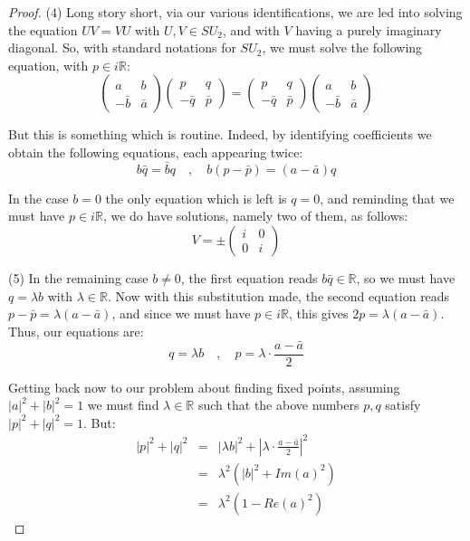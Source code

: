 \documentclass[12pt]{amsbook}
\begin{document}
\begin{proof}
\medskip

(4) Long story short, via our various identifications, we are led into solving the equation $UV=VU$ with $U,V\in SU_2$, and with $V$ having a purely imaginary diagonal. So, with standard notations for $SU_2$, we must solve the following equation, with $p\in i\mathbb R$:
$$\begin{pmatrix}a&b\\-\bar{b}&\bar{a}\end{pmatrix}
\begin{pmatrix}p&q\\-\bar{q}&\bar{p}\end{pmatrix}
=\begin{pmatrix}p&q\\-\bar{q}&\bar{p}\end{pmatrix}
\begin{pmatrix}a&b\\-\bar{b}&\bar{a}\end{pmatrix}$$

But this is something which is routine. Indeed, by identifying coefficients we obtain the following equations, each appearing twice:
$$b\bar{q}=\bar{b}q\quad,\quad b(p-\bar{p})=(a-\bar{a})q$$

In the case $b=0$ the only equation which is left is $q=0$, and reminding that we must have $p\in i\mathbb R$, we do have solutions, namely two of them, as follows:
$$V=\pm\begin{pmatrix}i&0\\0&i\end{pmatrix}$$

(5) In the remaining case $b\neq0$, the first equation reads $b\bar{q}\in\mathbb R$, so we must have $q=\lambda b$ with $\lambda\in\mathbb R$. Now with this substitution made, the second equation reads $p-\bar{p}=\lambda(a-\bar{a})$, and since we must have $p\in i\mathbb R$, this gives $2p=\lambda(a-\bar{a})$. Thus, our equations are:
$$q=\lambda b\quad,\quad p=\lambda\cdot\frac{a-\bar{a}}{2}$$

Getting back now to our problem about finding fixed points, assuming $|a|^2+|b|^2=1$ we must find $\lambda\in\mathbb R$ such that the above numbers $p,q$ satisfy $|p|^2+|q|^2=1$. But:
\begin{eqnarray*}
|p|^2+|q|^2
&=&|\lambda b|^2+\left|\lambda\cdot\frac{a-\bar{a}}{2}\right|^2\\
&=&\lambda^2(|b|^2+Im(a)^2)\\
&=&\lambda^2(1-Re(a)^2)
\end{eqnarray*}


\end{proof}
\end{document}

